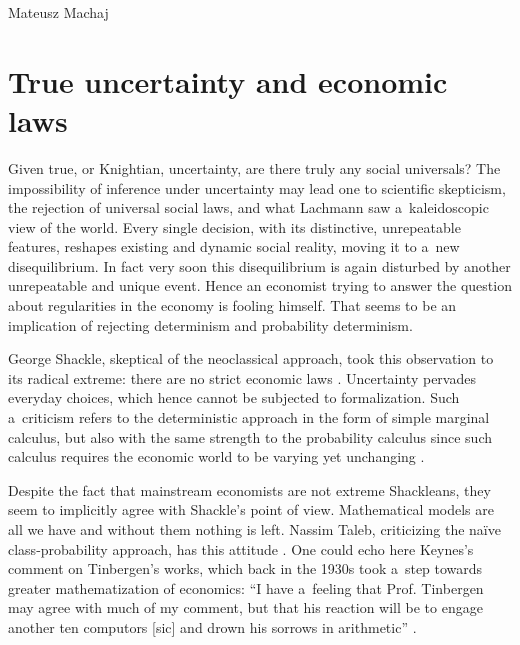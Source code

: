 \begin{artengenv}{Mateusz Machaj}
\section{True uncertainty and economic laws}

Given true, or Knightian, uncertainty, are there truly any social universals? The impossibility of inference under uncertainty may lead one to scientific skepticism, the rejection of universal social laws, and what Lachmann 
\parencite*[][]{lachmann_mises_1976} %
 saw a~kaleidoscopic view of the world. Every single decision, with its distinctive, unrepeatable features, reshapes existing and dynamic social reality, moving it to a~new disequilibrium. In fact very soon this disequilibrium is again disturbed by another unrepeatable and unique event. Hence an economist trying to answer the question about regularities in the economy is fooling himself. That seems to be an implication of rejecting determinism and probability determinism.



George Shackle, skeptical of the neoclassical approach, took this observation to its radical extreme: there are no strict economic laws 
\parencite[][p.427]{shackle_epistemics_1972}. %
 Uncertainty pervades everyday choices, which hence cannot be subjected to formalization. Such a~criticism refers to the deterministic approach in the form of simple marginal calculus, but also with the same strength to the probability calculus since such calculus requires the economic world to be varying yet unchanging 
\parencite[][p.381]{shackle_epistemics_1972}.%




Despite the fact that mainstream economists are not extreme Shackleans, they seem to implicitly agree with Shackle's point of view. Mathematical models are all we have and without them nothing is left. Nassim Taleb, criticizing the naïve class-probability approach, has this attitude 
\parencite[][p.276]{taleb_black_2007}. %
 One could echo here Keynes's comment on Tinbergen's works, which back in the 1930s took a~step towards greater mathematization of economics: ``I have a~feeling that Prof. Tinbergen may agree with much of my comment, but that his reaction will be to engage another ten computors [sic] and drown his sorrows in arithmetic'' 
\parencite[][p.568]{keynes_professor_1939}.%





\end{artengenv}
